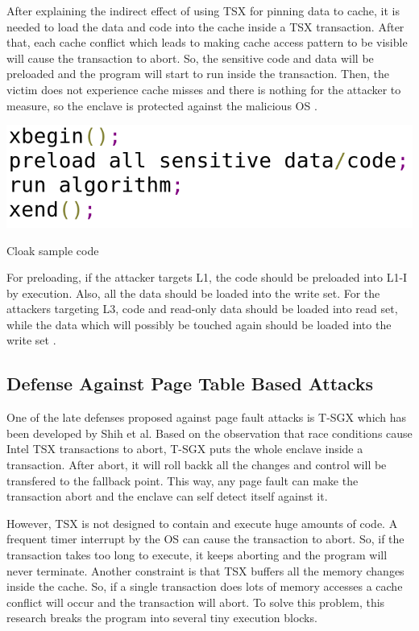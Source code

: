 After explaining the indirect effect of using TSX for pinning data to cache, it is needed to load the data and code into the cache inside a TSX transaction. After that, each cache conflict which leads to making cache access pattern to be visible will cause the transaction to abort. So, the sensitive code and data will be preloaded and the program will start to run inside the transaction. Then, the victim does not experience cache misses and there is nothing for the attacker to measure, so the enclave is protected against the malicious OS \cite{cloak}.

\begin{algorithm}[t]
	\includegraphics[scale=0.25]{images/cloakcode}
	\caption{Cloak sample code \cite{cloak}}
	\label{alg:cloak}
\end{algorithm}

For preloading, if the attacker targets L1, the code should be preloaded into L1-I by execution. Also, all the data should be loaded into the write set. For the attackers targeting L3, code and read-only data should be loaded into read set, while the data which will possibly be touched again should be loaded into the write set \cite{cloak}.

\subsection{Defense Against Page Table Based Attacks}
One of the late defenses proposed against page fault attacks is T-SGX \cite{tsgx} which has been developed by Shih et al. Based on the observation that race conditions cause Intel TSX transactions to abort, T-SGX puts the whole enclave inside a transaction. After abort, it will roll backk all the changes and control will be transfered to the fallback point. This way, any page fault can make the transaction abort and the enclave can self detect itself against it.

However, TSX is not designed to contain and execute huge amounts of code. A frequent timer interrupt by the OS can cause the transaction to abort. So, if the transaction takes too long to execute, it keeps aborting and the program will never terminate. Another constraint is that TSX buffers all the memory changes inside the cache. So, if a single transaction does lots of memory accesses a cache conflict will occur and the transaction will abort. To solve this problem, this research breaks the program into several tiny execution blocks.

